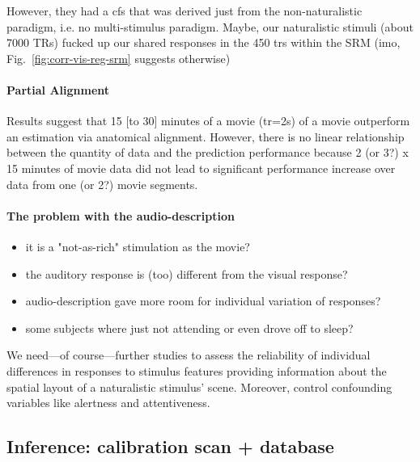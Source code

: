 %
However, they had a \ac{cfs} that was derived just from the non-naturalistic
paradigm, i.e. no multi-stimulus paradigm.
%
Maybe, our naturalistic stimuli (about 7000 TRs) fucked up our shared responses
in the 450 \acp{tr} within the SRM (imo, Fig.~\ref{fig:corr-vis-reg-srm}
suggests otherwise)


\paragraph{Partial Alignment}


%
Results suggest that 15 [to 30] minutes of a movie (\ac{tr}=2s) of a movie
outperform an estimation via anatomical alignment.
%
However, there is no linear relationship between the quantity of data and the
prediction performance because 2 (or 3?) x 15 minutes of movie data did not lead
to significant performance increase over data from one (or 2?) movie segments.


\paragraph{The problem with the audio-description}

\begin{itemize}

    \item it is a "not-as-rich" stimulation as the movie?

    \item the auditory response is (too) different from the visual response?

    \item audio-description gave more room for individual variation of
        responses?

    \item some subjects where just not attending or even drove off to sleep?

\end{itemize}
%
We need---of course---further studies to assess the reliability of individual
differences in responses to stimulus features providing information about the
spatial layout of a naturalistic stimulus' scene.
%
Moreover, control confounding variables like alertness and attentiveness.


\subsection{Inference: calibration scan + database}


